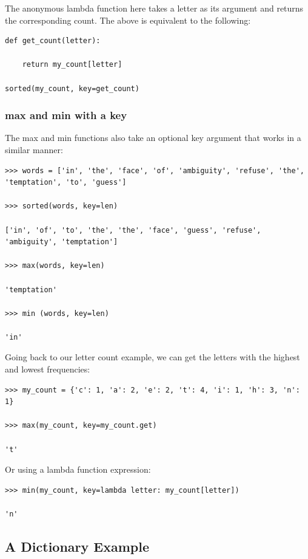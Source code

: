 \documentclass{article}
\begin{document}
The anonymous lambda function here takes a letter as its argument and returns the corresponding count. The above is equivalent to the following:

\begin{lstlisting}
def get_count(letter):

    return my_count[letter]

sorted(my_count, key=get_count)
\end{lstlisting}

\subsubsection{max and min with a key}

The max and min functions also take an optional key argument that works in a similar manner:

\begin{lstlisting}
>>> words = ['in', 'the', 'face', 'of', 'ambiguity', 'refuse', 'the', 'temptation', 'to', 'guess']

>>> sorted(words, key=len)

['in', 'of', 'to', 'the', 'the', 'face', 'guess', 'refuse', 'ambiguity', 'temptation']

>>> max(words, key=len)

'temptation'

>>> min (words, key=len)

'in'
\end{lstlisting}

Going back to our letter count example, we can get the letters with the highest and lowest frequencies:

\begin{lstlisting}
>>> my_count = {'c': 1, 'a': 2, 'e': 2, 't': 4, 'i': 1, 'h': 3, 'n': 1}

>>> max(my_count, key=my_count.get)

't'
\end{lstlisting}

Or using a lambda function expression:

\begin{lstlisting}
>>> min(my_count, key=lambda letter: my_count[letter])

'n'
\end{lstlisting}

\subsection{A Dictionary Example}
\end{document}
